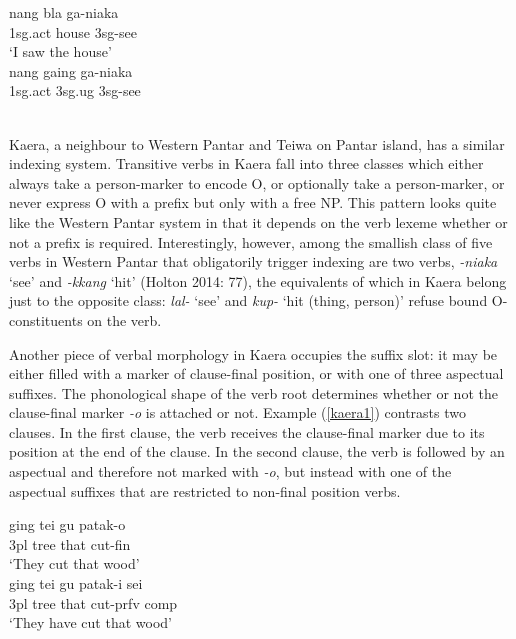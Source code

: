 \pex 
\a \label{wp02a}
\gll nang bla ga-niaka \\
\acs{1}\acs{sg}.\acs{act} house \acs{3}\acs{sg}-see \\
\glft `I saw the house' \\ 
\z
\a \label{wp02b}
\gla *nang gaing ga-niaka \\ 
\acs{1}\acs{sg}.\acs{act} \acs{3}\acs{sg}.\acs{ug} \acs{3}\acs{sg}-see \\
\glft  {}\\ 
\z
\xe

Kaera, a neighbour to Western Pantar and Teiwa on Pantar island, has a similar indexing system. Transitive verbs in Kaera fall into three classes which either always take a person-marker to encode O, or optionally take a person-marker, or never express O with a prefix but only with a free NP. This pattern looks quite like the Western Pantar system in that it depends on the verb lexeme whether or not a prefix is required. Interestingly, however, among the smallish class of five verbs in Western Pantar that obligatorily trigger indexing are two verbs, \textit{-niaka} `see' and \textit{-kkang} `hit' (Holton 2014: 77), the equivalents of which in Kaera belong just to the opposite class: \textit{lal-} `see' and \textit{kup-} `hit (thing, person)' refuse bound O-constituents on the verb. 

Another piece of verbal morphology in Kaera occupies the suffix slot: it may be either filled with a marker of clause-final position, or with one of three aspectual suffixes. The phonological shape of the verb root determines whether or not the clause-final marker \textit{-o} is attached or not. Example (\ref{kaera1}) contrasts two clauses. In the first clause, the verb receives the clause-final marker due to its position at the end of the clause. In the second clause, the verb is followed by an aspectual and therefore not marked with \textit{-o}, but instead with one of the aspectual suffixes that are restricted to non-final position verbs.

\pex \label{kaera1}
\a
\gll ging tei gu patak-o \\
\acs{3}\acs{pl} tree that cut-\acs{fin} \\
\glft `They cut that wood' \\ 
\z
\a
\gla ging tei gu patak-i sei \\ 
\acs{3}\acs{pl} tree that cut-\acs{prfv} \acs{comp} \\
\glft `They have cut that wood' \\ 
\z
\xe


